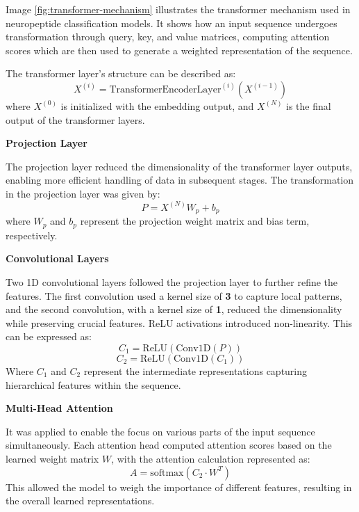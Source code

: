 \documentclass[conference]{IEEEtran}
\begin{document}
Image \ref{fig:transformer-mechanism} illustrates the transformer mechanism used in neuropeptide classification models. It shows how an input sequence undergoes transformation through query, key, and value matrices, computing attention scores which are then used to generate a weighted representation of the sequence.


The transformer layer’s structure can be described as:
\begin{equation}
X^{(i)} = \text{TransformerEncoderLayer}^{(i)}(X^{(i-1)})
\end{equation}
where \(X^{(0)}\) is initialized with the embedding output, and \(X^{(N)}\) is the final output of the transformer layers.

\vspace{0.15cm} 
\textbf{Projection Layer}

The projection layer reduced the dimensionality of the transformer layer outputs, enabling more efficient handling of data in subsequent stages. The transformation in the projection layer was given by:
\begin{equation}
P = X^{(N)} W_p + b_p
\end{equation}
where \(W_p\) and \(b_p\) represent the projection weight matrix and bias term, respectively.

\vspace{0.15cm} 
\textbf{Convolutional Layers}

Two 1D convolutional layers followed the projection layer to further refine the features. The first convolution used a kernel size of \textbf{3} to capture local patterns, and the second convolution, with a kernel size of \textbf{1}, reduced the dimensionality while preserving crucial features. ReLU activations introduced non-linearity. This can be expressed as:
\begin{equation}
C_1 = \text{ReLU}(\text{Conv1D}(P))
\end{equation}
\begin{equation}
C_2 = \text{ReLU}(\text{Conv1D}(C_1))
\end{equation}
Where \(C_1\) and \(C_2\) represent the intermediate representations capturing hierarchical features within the sequence.

\vspace{0.15cm} 
\textbf{Multi-Head Attention}

It was applied to enable the focus on various parts of the input sequence simultaneously. Each attention head computed attention scores based on the learned weight matrix \(W\), with the attention calculation represented as:
\begin{equation}
A = \text{softmax}(C_2 \cdot W^T)
\end{equation}
This allowed the model to weigh the importance of different features, resulting in the overall learned representations.
\end{document}
